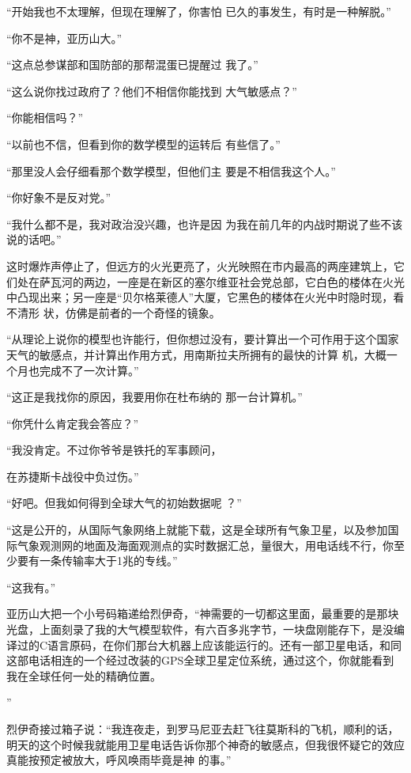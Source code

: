 \documentclass{article}
\begin{document}
\newpage

“开始我也不太理解，但现在理解了，你害怕
已久的事发生，有时是一种解脱。” 


“你不是神，亚历山大。” 

“这点总参谋部和国防部的那帮混蛋已提醒过
我了。” 

“这么说你找过政府了？他们不相信你能找到
大气敏感点？” 


“你能相信吗？” 

“以前也不信，但看到你的数学模型的运转后
有些信了。” 

“那里没人会仔细看那个数学模型，但他们主
要是不相信我这个人。” 


“你好象不是反对党。” 

\newpage

“我什么都不是，我对政治没兴趣，也许是因
为我在前几年的内战时期说了些不该说的话吧。” 

这时爆炸声停止了，但远方的火光更亮了，火光映照在市内最高的两座建筑上，它们处在萨瓦河的两边，一座是在新区的塞尔维亚社会党总部，它白色的楼体在火光中凸现出来；另一座是“贝尔格莱德人”大厦，它黑色的楼体在火光中时隐时现，看不清形
状，仿佛是前者的一个奇怪的镜象。 

“从理论上说你的模型也许能行，但你想过没有，要计算出一个可作用于这个国家天气的敏感点，并计算出作用方式，用南斯拉夫所拥有的最快的计算
机，大概一个月也完成不了一次计算。” 

“这正是我找你的原因，我要用你在杜布纳的
那一台计算机。” 


“你凭什么肯定我会答应？” 

“我没肯定。不过你爷爷是铁托的军事顾问，
\newpage

在苏捷斯卡战役中负过伤。” 

“好吧。但我如何得到全球大气的初始数据呢
？” 

“这是公开的，从国际气象网络上就能下载，这是全球所有气象卫星，以及参加国际气象观测网的地面及海面观测点的实时数据汇总，量很大，用电话线不行，你至少要有一条传输率大于1兆的专线。”
 


“这我有。” 

亚历山大把一个小号码箱递给烈伊奇，“神需要的一切都这里面，最重要的是那块光盘，上面刻录了我的大气模型软件，有六百多兆字节，一块盘刚能存下，是没编译过的C语言原码，在你们那台大机器上应该能运行的。还有一部卫星电话，和同这部电话相连的一个经过改装的GPS全球卫星定位系统，通过这个，你就能看到我在全球任何一处的精确位置。

\newpage
” 

烈伊奇接过箱子说：“我连夜走，到罗马尼亚去赶飞往莫斯科的飞机，顺利的话，明天的这个时候我就能用卫星电话告诉你那个神奇的敏感点，但我很怀疑它的效应真能按预定被放大，呼风唤雨毕竟是神
的事。” 
\end{document}
